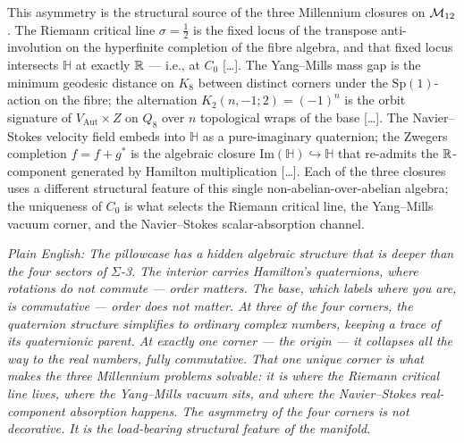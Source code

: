 This asymmetry is the structural source of the three Millennium closures on $\mathcal{M}_{12}$.  The Riemann critical line $\sigma = \tfrac{1}{2}$ is the fixed locus of the transpose anti-involution on the hyperfinite completion of the fibre algebra, and that fixed locus intersects $\mathbb{H}$ at exactly $\mathbb{R}$ --- i.e., at $C_0$ [\ldots].  The Yang--Mills mass gap is the minimum geodesic distance on $K_8$ between distinct corners under the $\mathrm{Sp}(1)$-action on the fibre; the alternation $K_2(n, -1; 2) = (-1)^n$ is the orbit signature of $V_{\mathrm{Aut}} \times Z$ on $Q_8$ over $n$ topological wraps of the base [\ldots].  The Navier--Stokes velocity field embeds into $\mathbb{H}$ as a pure-imaginary quaternion; the Zwegers completion $\hat f = f + g^*$ is the algebraic closure $\mathrm{Im}(\mathbb{H}) \hookrightarrow \mathbb{H}$ that re-admits the $\mathbb{R}$-component generated by Hamilton multiplication [\ldots].  Each of the three closures uses a different structural feature of this single non-abelian-over-abelian algebra; the uniqueness of $C_0$ is what selects the Riemann critical line, the Yang--Mills vacuum corner, and the Navier--Stokes scalar-absorption channel.

\emph{Plain English: The pillowcase has a hidden algebraic structure that is deeper than the four sectors of $\Sigma$-3.  The interior carries Hamilton's quaternions, where rotations do not commute --- order matters.  The base, which labels where you are, is commutative --- order does not matter.  At three of the four corners, the quaternion structure simplifies to ordinary complex numbers, keeping a trace of its quaternionic parent.  At exactly one corner --- the origin --- it collapses all the way to the real numbers, fully commutative.  That one unique corner is what makes the three Millennium problems solvable: it is where the Riemann critical line lives, where the Yang--Mills vacuum sits, and where the Navier--Stokes real-component absorption happens.  The asymmetry of the four corners is not decorative.  It is the load-bearing structural feature of the manifold.}

\smallskip

